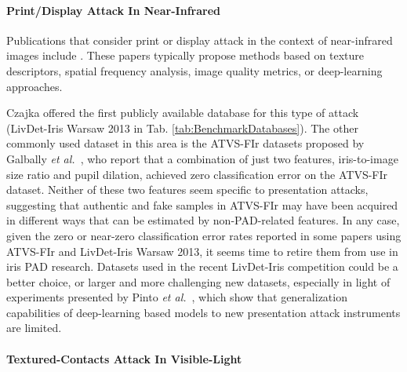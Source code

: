 \documentclass[format=acmsmall, review=false, timestamp=false]{acmart}
\newcommand{\etal}{{\it et al.}~}
\begin{document}
\paragraph{Print/Display Attack In Near-{Infrared}}
Publications that consider print or display attack in the context of near-{infrared} images include
\cite{Bhogal_BF_2017,Czajka_ICMMAR_2013,Galbally_ICB_2012,Galbally_TIP_2014,Gragnaniello_TIFS_2015,HeXiaofu_ICB_2009,Karunya_ACCS_2015,Menotti_TIFS_2015,Ortiz-Lopez_ICCST_2011,Pacut_ICCST_2006,Czajka_SPIE_2007,Raghavendra_EUSIPCO_2014,Sequeira_IJCNN_2014,Sun_PAMI_2014,Takano_SCE_2009,Pinto_DLB_2018,Sequeira_VISAPPa_2014,Chen_WACV_2018,Raja_BIOSIG_2016,Sollinger_IET_2017}. {These papers typically propose methods based on texture descriptors, spatial frequency analysis, image quality metrics, or deep-learning approaches.} 

Czajka \cite{Czajka_ICMMAR_2013} offered the first publicly available database for this type of attack ({\sf LivDet-Iris Warsaw 2013} in Tab. \ref{tab:BenchmarkDatabases}). The other commonly used dataset in this area is the {\sf ATVS-FIr} datasets proposed by Galbally \etal \cite{Galbally_ICB_2012}, who report that a combination of just two features, iris-to-image size ratio and pupil dilation, achieved zero classification error on the {\sf ATVS-FIr} dataset. Neither of these two features seem specific to presentation attacks, suggesting that authentic and {fake} samples in {\sf ATVS-FIr} may have been acquired in different ways that can be estimated by non-PAD-related features. In any case, given the zero or near-zero classification error rates reported in some papers using {\sf ATVS-FIr} and {\sf LivDet-Iris Warsaw 2013}, it seems time to retire them from use in iris PAD research. Datasets used in the recent LivDet-Iris competition \cite{Yambay_IJCB_2017} could be a better choice, or larger and more challenging new datasets, especially in light of experiments presented by Pinto \etal \cite{Pinto_DLB_2018}, which show that generalization capabilities of deep-learning based models to new presentation attack instruments {are} limited. 

\paragraph{Textured-Contacts Attack In Visible-Light}
\end{document}
